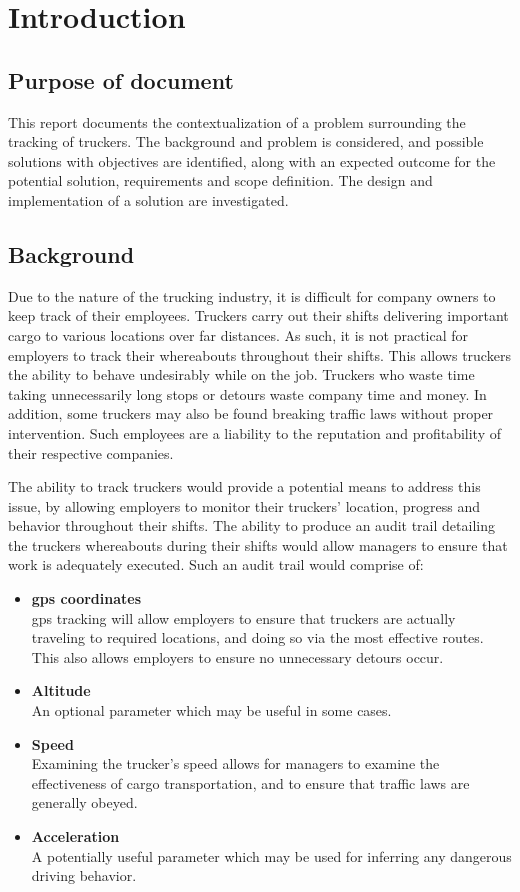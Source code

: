 \section{Introduction}
\subsection{Purpose of document}
This report documents the contextualization of a problem surrounding the tracking of truckers.
The background and problem is considered, and possible solutions with objectives are identified, along with an expected outcome for the potential solution, requirements and scope definition.
The design and implementation of a solution are investigated.

\subsection{Background}
Due to the nature of the trucking industry, it is difficult for company owners to keep track of their employees.
Truckers carry out their shifts delivering important cargo to various locations over far distances.
As such, it is not practical for employers to track their whereabouts throughout their shifts.
This allows truckers the ability to behave undesirably while on the job.
Truckers who waste time taking unnecessarily long stops or detours waste company time and money.
In addition, some truckers may also be found breaking traffic laws without proper intervention.
Such employees are a liability to the reputation and profitability of their respective companies.

The ability to track truckers would provide a potential means to address this issue, by allowing employers to monitor their truckers' location, progress and behavior throughout their shifts.
The ability to produce an audit trail detailing the truckers whereabouts during their shifts would allow managers to ensure that work is adequately executed. Such an audit trail would comprise of:
\begin{itemize}
\item \textbf{\ac{gps} coordinates\\}
\ac{gps} tracking will allow employers to ensure that truckers are actually traveling to required locations, and doing so via the most effective routes. This also allows employers to ensure no unnecessary detours occur.
\item \textbf{Altitude\\}
An optional parameter which may be useful in some cases.
\item \textbf{Speed\\}
Examining the trucker's speed allows for managers to examine the effectiveness of cargo transportation, and to ensure that traffic laws are generally obeyed.
\item \textbf{Acceleration\\}
A potentially useful parameter which may be used for inferring any dangerous driving behavior. 
\end{itemize}

